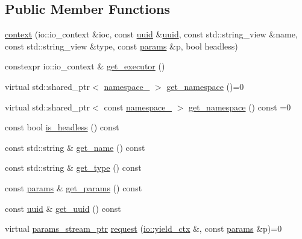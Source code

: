 \subsection*{Public Member Functions}
\begin{DoxyCompactItemize}
\item 
\hyperlink{classtelegraph_1_1context_ad57ca6ff5da9ad653c688e7be3c0bbdc}{context} (io\+::io\+\_\+context \&ioc, const \hyperlink{namespacetelegraph_a51ee91d7eaeef067f7ccac2b170e5d59}{uuid} \&\hyperlink{namespacetelegraph_a51ee91d7eaeef067f7ccac2b170e5d59}{uuid}, const std\+::string\+\_\+view \&name, const std\+::string\+\_\+view \&type, const \hyperlink{classtelegraph_1_1params}{params} \&p, bool headless)
\item 
constexpr io\+::io\+\_\+context \& \hyperlink{classtelegraph_1_1context_a5df9df51fb9fc54d69e4a7d43e66345a}{get\+\_\+executor} ()
\item 
virtual std\+::shared\+\_\+ptr$<$ \hyperlink{classtelegraph_1_1namespace__}{namespace\+\_\+} $>$ \hyperlink{classtelegraph_1_1context_a84d92cca54be9c4e885e2673480e45a1}{get\+\_\+namespace} ()=0
\item 
virtual std\+::shared\+\_\+ptr$<$ const \hyperlink{classtelegraph_1_1namespace__}{namespace\+\_\+} $>$ \hyperlink{classtelegraph_1_1context_a2f6c9ecc15cee66415828df9efa834a2}{get\+\_\+namespace} () const =0
\item 
const bool \hyperlink{classtelegraph_1_1context_a4cfaa125584e2f5ee5121c074bc024f1}{is\+\_\+headless} () const
\item 
const std\+::string \& \hyperlink{classtelegraph_1_1context_a56bd2af5bbfcdc234f6dd8df052585d7}{get\+\_\+name} () const
\item 
const std\+::string \& \hyperlink{classtelegraph_1_1context_a07d07a63d22454c2dc900c5cf749ce18}{get\+\_\+type} () const
\item 
const \hyperlink{classtelegraph_1_1params}{params} \& \hyperlink{classtelegraph_1_1context_ab8f2cf6a295d840f8011ff1b5533a1f8}{get\+\_\+params} () const
\item 
const \hyperlink{namespacetelegraph_a51ee91d7eaeef067f7ccac2b170e5d59}{uuid} \& \hyperlink{classtelegraph_1_1context_adfc55d7a2ba9d68c1f52abcbac7d74fd}{get\+\_\+uuid} () const
\item 
virtual \hyperlink{namespacetelegraph_ad071241508ea0f86c7de0686016f9ca9}{params\+\_\+stream\+\_\+ptr} \hyperlink{classtelegraph_1_1context_a6765d7fa22fe99b9a6723c511396b781}{request} (\hyperlink{structboost_1_1asio_1_1yield__ctx}{io\+::yield\+\_\+ctx} \&, const \hyperlink{classtelegraph_1_1params}{params} \&p)=0

\end{DoxyCompactItemize}
